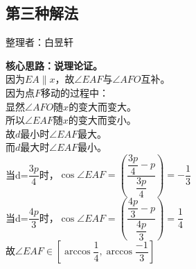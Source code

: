 \documentclass[UTF8]{ctexart}
\begin{document}
\subsection{第三种解法}
    \begin{center}
        整理者：白昱轩
    \end{center}
    \begin{multicols}{1}
        \small
        \textbf{核心思路：说理论证。}\\[5mm]
        因为$EA\parallel x$，故$\angle EAF$与$\angle AFO$互补。\\[5mm]
        因为点$F$移动的过程中：\\[5mm]
        显然$\angle AFO$随$x$的变大而变大。\\[5mm]
        所以$\angle EAF$随$x$的变大而变小。\\[5mm]
        故$d$最小时$\angle EAF$最大。\\[5mm]
        而$d$最大时$\angle EAF$最小。\\[5mm]
        当d=$\dfrac{3p}{4}$时，$\cos \angle EAF = \left(\dfrac{\dfrac{3p}{4}-p}{\dfrac{3p}{4}}  \right) = -\dfrac{1}{3}$\\[3mm]
        当d=$\dfrac{4p}{3}$时，$\cos \angle EAF = \left(\dfrac{\dfrac{4p}{3}-p}{\dfrac{4p}{3}}  \right) = \dfrac{1}{4}$\\[3mm]
        故$\angle EAF \in \left[\arccos \dfrac{1}{4} , \arccos \dfrac{-1}{3}\right]$\\[10mm]
        \newpage
    \end{multicols}

\newpage
\end{document}
